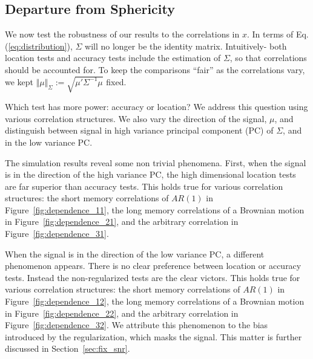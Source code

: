 \documentclass[12pt,a4paper]{article}
\begin{document}
\subsection{Departure from Sphericity}
\label{sec:dependence}

We now test the robustness of our results to the correlations in $x$. 
In terms of Eq.(\ref{eq:distribution}), $\Sigma$ will no longer be the identity matrix. 
Intuitively- both location tests and accuracy tests include the estimation of $\Sigma$, so that correlations should be accounted for. 
To keep the comparisons ``fair'' as the correlations vary, we kept $\Vert \mu \Vert_\Sigma:=\sqrt{\mu'\Sigma^{-1}\mu}$ fixed. 

Which test has more power: accuracy or location?
We address this question using various correlation structures.
We also vary the direction of the signal, $\mu$, and distinguish between signal in high variance principal component (PC) of $\Sigma$, and in the low variance PC. 

The simulation results reveal some non trivial phenomena.
First, when the signal is in the direction of the high variance PC, the high dimensional location tests are far superior than accuracy tests. 
This holds true for various correlation structures: the short memory correlations of $AR(1)$ in Figure~\ref{fig:dependence_11}, the long memory correlations of a Brownian motion in Figure~\ref{fig:dependence_21}, and the arbitrary correlation in Figure~\ref{fig:dependence_31}.

When the signal is in the direction of the low variance PC, a different phenomenon appears.
There is no clear preference between location or accuracy tests.
Instead the non-regularized tests are the clear victors. 
This holds true for various correlation structures: the short memory correlations of $AR(1)$ in Figure~\ref{fig:dependence_12}, the long memory correlations of a Brownian motion in Figure~\ref{fig:dependence_22}, and the arbitrary correlation in Figure~\ref{fig:dependence_32}.
We attribute this phenomenon to the bias introduced by the regularization, which masks the signal.
This matter is further discussed in Section~\ref{sec:fix_snr}.
\end{document}
